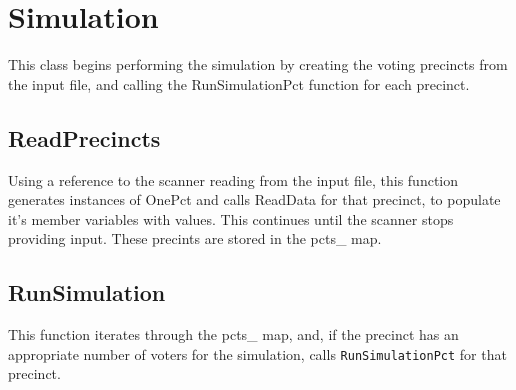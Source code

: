 %

\chapter{Simulation}
This class begins performing the simulation by creating the voting precincts from the input file, and calling the RunSimulationPct function for each precinct.

\section{ReadPrecincts}
Using a reference to the scanner reading from the input file, this function generates instances of OnePct and calls ReadData for that precinct, to populate it's member variables with values.
This continues until the scanner stops providing input.  These precints are stored in the pcts\_ map.

\section{RunSimulation}
This function iterates through the pcts\_ map, and, if the precinct has an appropriate number of voters for the simulation, calls \texttt{RunSimulationPct} for that precinct.